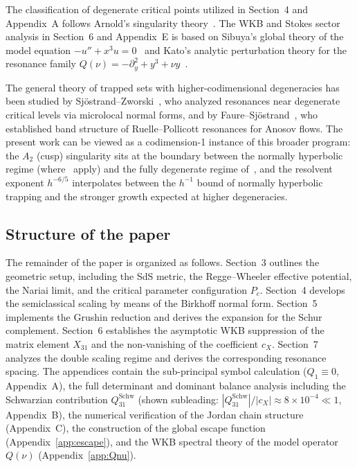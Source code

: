 \documentclass[12pt,a4paper]{amsart}
\theoremstyle{remark}
\begin{document}
The classification of degenerate critical points utilized in Section~4 and Appendix~A
follows Arnold's singularity theory~\cite{Arnold72}. The WKB and Stokes sector analysis in Section~6 and
Appendix~E is based on Sibuya's global theory of the model equation
$-u'' + x^3 u = 0$~\cite{Sibuya75} and Kato's analytic perturbation theory
for the resonance family $Q(\nu) = -\partial_y^2 + y^3 + \nu y$~\cite{Kato66}.

The general theory of trapped sets with higher-codimensional degeneracies has been
studied by Sj\"{o}strand--Zworski~\cite{SZ91}, who analyzed resonances near
degenerate critical levels via microlocal normal forms, and by
Faure--Sj\"{o}strand~\cite{FS11}, who established band structure of Ruelle--Pollicott
resonances for Anosov flows. The present work can be viewed as a codimension-1
instance of this broader program: the $A_2$ (cusp) singularity sits at the boundary
between the normally hyperbolic regime (where~\cite{WZ11,NZ15} apply) and the
fully degenerate regime of~\cite{SZ91}, and the resolvent exponent $h^{-6/5}$
interpolates between the $h^{-1}$ bound of normally hyperbolic trapping and
the stronger growth expected at higher degeneracies.

\subsection*{Structure of the paper}

The remainder of the paper is organized as follows. Section~3 outlines the geometric setup, including
the SdS metric, the Regge--Wheeler effective potential, the Nariai limit, and the critical parameter
configuration $P_c$. Section~4 develops the semiclassical scaling by means of the Birkhoff normal form.
Section~5 implements the Grushin reduction and derives the expansion for the Schur complement.
Section~6 establishes the asymptotic WKB suppression of the matrix element $X_{31}$ and
the non-vanishing of the coefficient $c_X$. Section~7 analyzes the double scaling regime and
derives the corresponding resonance spacing. The appendices contain the sub-principal symbol
calculation ($Q_1 \equiv 0$, Appendix~A), the full determinant and dominant balance
analysis including the Schwarzian contribution $Q^{\mathrm{Schw}}_{31}$
(shown subleading: $|Q^{\mathrm{Schw}}_{31}|/|c_X| \approx 8\times10^{-4} \ll 1$,
Appendix~B), the numerical verification of the Jordan chain structure
(Appendix~C), the construction of the global escape function (Appendix~\ref{app:escape}), and the WKB spectral
theory of the model operator $Q(\nu)$ (Appendix~\ref{app:Qnu}).
\end{document}
